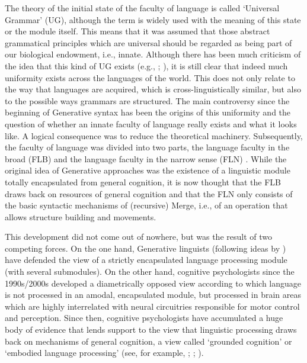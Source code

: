 \noindent The theory of the initial state of the faculty of language is called `Universal Grammar' (UG), although the term is widely used with the meaning of this state or the module itself. This means that it was assumed that those abstract grammatical principles which are universal should be regarded as being part of our biological endowment, i.e., innate. Although there has been much criticism of the idea that this kind of UG exists (e.g., \citealt{evans2009myth}; \citealt{levinson2010time}), it is still clear that indeed much uniformity exists across the languages of the world. This does not only relate to the way that languages are acquired, which is cross-linguistically similar, but also to the possible ways grammars are structured. The main controversy since the beginning of Generative syntax has been the origins of this uniformity and the question of whether an innate faculty of language really exists and what it looks like. 
A logical consequence was to reduce the theoretical machinery. Subsequently, the faculty of language was divided into two parts, the language faculty in the broad (FLB) and the language faculty in the narrow sense (FLN) \citep{hauser2002faculty,fitch2005evolution}. While the original idea of Generative approaches was the existence of a linguistic module totally encapsulated from general cognition, it is now thought that the FLB draws back on resources of general cognition and that the FLN only consists of the basic syntactic mechanisms of (recursive) Merge, i.e., of an operation that allows structure building and movements. 

This development did not come out of nowhere, but was the result of two competing forces. On the one hand, Generative linguists (following ideas by \citealt{fodor1975language, jerry1983modularity}) have defended the view of a strictly encapsulated language processing module (with several submodules). On the other hand, cognitive psychologists since the 1990s/2000s developed a diametrically opposed view according to which language is not processed in an amodal, encapsulated  module, but processed in brain areas which are highly interrelated with neural circuitries responsible for motor control and perception. Since then, cognitive psychologists have accumulated a huge body of evidence that lends support to the view that linguistic processing draws back on mechanisms of general cognition, a view called `grounded cognition' or `embodied language processing' (see, for example, \citealt{glenberg2002grounding}; \citealt{pecher2005grounding}; \citealt{barsalou2008grounded}).


